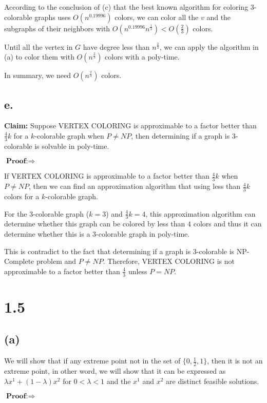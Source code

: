 \documentclass[a4paper,12pt]{article}
\begin{document}
According to the conclusion of (c) that the best known algorithm for coloring 3-colorable graphs uses $O(n^{0.19996})$ colors, we can color all the $v$ and the subgraphs of their neighbors with $O(n^{0.19996} n^{\frac{1}{3}}) < O(\frac{2}{3})$ colors.
 
Until all the vertex in $G$ have degree less than $  n^{\frac{2}{3}}$, we can apply the algorithm in (a) to color them with $O(n^{\frac{2}{3}})$ colors with a poly-time.

In summary, we need $O(n^{\frac{2}{3}}) $ colors.

\subsection*{e. }
\noindent \textbf{Claim:}
Suppose VERTEX COLORING is approximable to a factor better than $\frac{4}{3} k$ for a $k$-colorable graph when $P \neq NP$, then determining if a graph is 3-colorable is solvable in poly-time.

$\textbf{Proof:} \Rightarrow $  

If VERTEX COLORING is approximable to a factor better than $\frac{4}{3} k$ when $P \neq NP$, then we can find an approximation algorithm that using less than $\frac{4}{3} k$ colors for a $k$-colorable graph. 

For the 3-colorable graph ($k=3$) and $\frac{4}{3} k=4$, this approximation algorithm can determine whether this graph can be colored by less than  $4$ colors and thus it can determine whether this is a 3-colorable graph in poly-time.
 
This is contradict to the fact that determining if a graph is 3-colorable is NP-Complete problem and $P \neq NP$. Therefore, VERTEX COLORING  is not approximable to a factor better than $\frac{4}{3}$ unless $P=NP$.
 

\section*{1.5 }
\subsection*{(a) }
We will show that if any extreme point not in the set of $\{0, \frac{1}{2}, 1\}$, then it is not an extreme point, in other word, we will show that it can be expressed as $\lambda x^1 + (1-\lambda) x^2$ for $0 < \lambda < 1$ and the $x^1$ and $x^2$ are distinct feasible  solutions.

$\textbf{Proof:} \Rightarrow $ 
\end{document}
